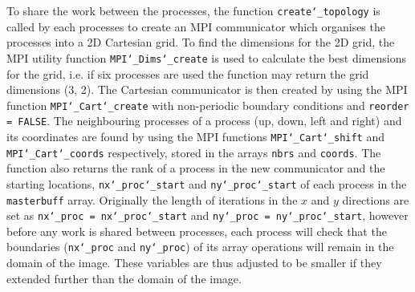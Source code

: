 \documentclass[11pt, a4paper]{article}
\begin{document}
			To share the work between the processes, the function \texttt{create\char`_topology} is called by each processes to create an MPI communicator which organises the processes into a 2D Cartesian grid. To find the dimensions for the 2D grid, the MPI utility function \texttt{MPI\char`_Dims\char`_create} is used to calculate the best dimensions for the grid, i.e. if six processes are used the function may return the grid dimensions  (3, 2). The Cartesian communicator is then created by using the MPI function \texttt{MPI\char`_Cart\char`_create} with non-periodic boundary conditions and \texttt{reorder = FALSE}. The neighbouring processes of a process (up, down, left and right) and its coordinates are found by using the MPI functions \texttt{MPI\char`_Cart\char`_shift} and \texttt{MPI\char`_Cart\char`_coords} respectively, stored in the arrays \texttt{nbrs} and \texttt{coords}. The function also returns the rank of a process in the new communicator and the starting locations, \texttt{nx\char`_proc\char`_start} and \texttt{ny\char`_proc\char`_start} of each process in the \texttt{masterbuff} array. Originally the length of iterations in the $x$ and $y$ directions are set as \texttt{nx\char`_proc = nx\char`_proc\char`_start} and \texttt{ny\char`_proc = ny\char`_proc\char`_start}, however before any work is shared between processes, each process will check that the boundaries (\texttt{nx\char`_proc} and \texttt{ny\char`_proc}) of its array operations will remain in the domain of the image. These variables are thus adjusted to be smaller if they extended further than the domain of the image.
			
\end{document}
